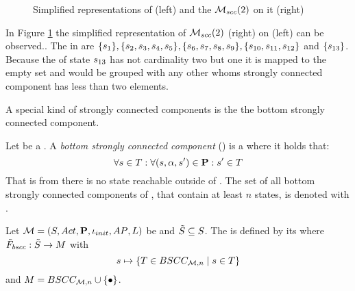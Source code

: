 \documentclass[preview]{standalone}
\begin{document}
\begin{figure}[h]
	\begin{minipage}{.55\textwidth}
		\hspace{5mm}
		
	\end{minipage}
	\begin{minipage}{.5\textwidth}
		
	\end{minipage}
		\caption{Simplified representations of \mdp (left) and the \viewN ${{{{{\mathcal{M}}}}_{{scc}}}}(2)$ on it (right)}
		\label{fig:sccMin2}  
\end{figure}

In Figure \ref{fig:sccMin2} the simplified representation of ${{{{{\mathcal{M}}}}_{{scc}}}}(2)$ (right) on \chgph (left) can be observed.. The \sccsN in \chgph are $\{{s}_1\}, \{{s}_2, {s}_3, {s}_4, {s}_5\}, \{{s}_6, {s}_7, {s}_8, {s}_9\}, \{{s}_{10}, {s}_{11}, {s}_{12}\}$ and $\{{s}_{13}\}$. Because the \sccN of state ${s}_{13}$ has not cardinality two but one it is mapped to the empty set and would be grouped with any other \state whoms strongly connected component has less than two elements.

A special kind of strongly connected components is the the bottom strongly connected component.

\begin{definition}
	Let \scc be a \sccN. A \emph{bottom strongly connected component} (\bsccN) is a \sccN where it holds that:
	\[
	\forall {s} \in {T} : \forall ({s}, {\alpha}, {s}') \in {\ensuremath{{\textbf{P}}}} : {s}' \in {T}
	\]
	That is from \scc there is no state reachable outside of \scc. The set of all bottom strongly connected components of \chgph, that contain at least $n$ states, is denoted with \setbscc.
\end{definition}


\begin{definition}
	Let ${{{\mathcal{M}}}} = {{({S}, {Act}, {\textbf{P}}, {\iota_{init}}, {AP}, {L})}}$ be \achgphN and ${\tilde{{S}}} \subseteq {S}$. The \viewN \viewbscc is defined by its \grpfctN \gfctbscc where ${{\tilde{F}_{{bscc}}}} : {\tilde{{S}}} \to {\ensuremath{{M}}}$ with
	\[
	{s} \mapsto \{{T} \in {BSCC_{\ensuremath{{{{\mathcal{M}}}}},n}} \mid {s} \in {T}\}
	\]
	and $\imggrp = \setbscc \cup \remset$.
\end{definition}
\end{document}
